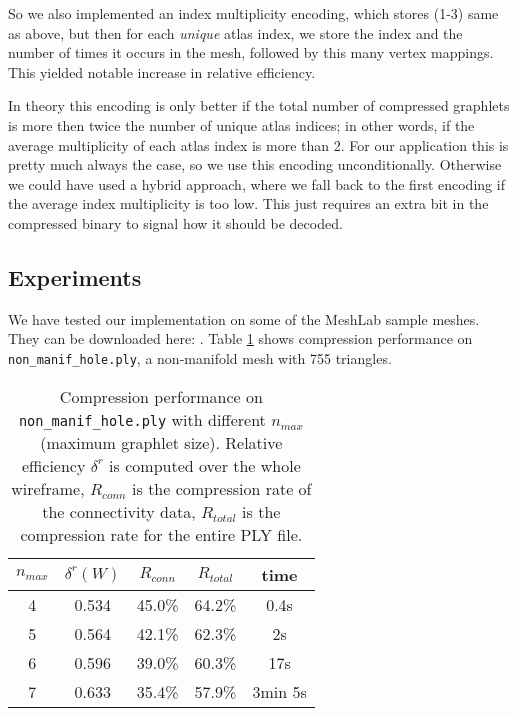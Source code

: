 \documentclass{egpubl}
\begin{document}
So we also implemented an index multiplicity encoding, which stores (1-3) same as above, but then for each \textit{unique} atlas index, we store the index and the number of times it occurs in the mesh, followed by this many vertex mappings. This yielded notable increase in relative efficiency. %

In theory this encoding is only better if the total number of compressed graphlets is more then twice the number of unique atlas indices; in other words, if the average multiplicity of each atlas index is more than 2. For our application this is pretty much always the case, so we use this encoding unconditionally. Otherwise we could have used a hybrid approach, where we fall back to the first encoding if the average index multiplicity is too low. This just requires an extra bit in the compressed binary to signal how it should be decoded.

\subsection{Experiments}

We have tested our implementation on some of the MeshLab sample meshes. They can be downloaded here: .
Table \ref{tab:compression_nonmanif} shows compression performance on \texttt{non\_manif\_hole.ply}, a non-manifold mesh with 755 triangles.

\begin{table}
        \centering
        \begin{tabular}{|c|c|c|c|c|}
        \hline
        $n_{max}$ & $\delta^r(W)$ & $R_{conn}$ & $R_{total}$ & time \\
        \hline
        4 & 0.534 & 45.0\% & 64.2\% & 0.4s \\
        5 & 0.564 & 42.1\% & 62.3\% & 2s \\
        6 & 0.596 & 39.0\% & 60.3\% & 17s \\
        7 & 0.633 & 35.4\% & 57.9\% & 3min 5s \\
        \hline
\end{tabular}
\caption{Compression performance on \texttt{non\_manif\_hole.ply} with different $n_{max}$ (maximum graphlet size). Relative efficiency $\delta^r$ is computed over the whole wireframe, $R_{conn}$ is the compression rate of the connectivity data, $R_{total}$ is the compression rate for the entire PLY file.}
\label{tab:compression_nonmanif}
\end{table}
\end{document}
